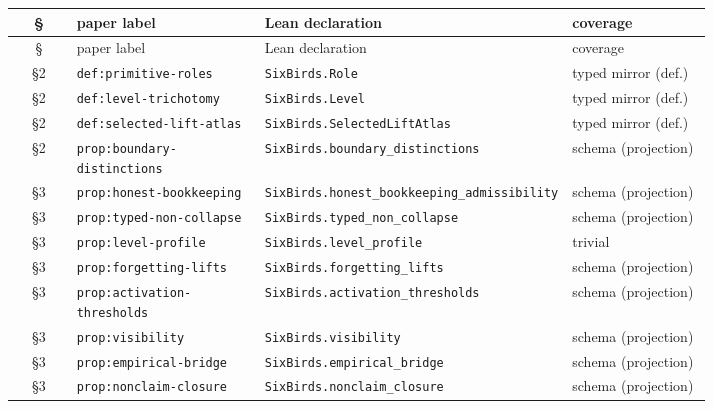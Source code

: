 \documentclass[11pt]{article}
\theoremstyle{definition}
\begin{document}
{\footnotesize
\begin{longtable}{@{}c >{\raggedright\arraybackslash}p{0.27\linewidth} >{\raggedright\arraybackslash}p{0.34\linewidth} >{\raggedright\arraybackslash}p{0.20\linewidth}@{}}
\toprule
\S & paper label & Lean declaration & coverage \\
\midrule
\endfirsthead
\toprule
\S & paper label & Lean declaration & coverage \\
\midrule
\endhead
\bottomrule
\endfoot
§2 & \texttt{def:\allowbreak primitive-\allowbreak roles} & \texttt{SixBirds.\allowbreak Role} & typed mirror (def.) \\
§2 & \texttt{def:\allowbreak level-\allowbreak trichotomy} & \texttt{SixBirds.\allowbreak Level} & typed mirror (def.) \\
§2 & \texttt{def:\allowbreak selected-\allowbreak lift-\allowbreak atlas} & \texttt{SixBirds.\allowbreak SelectedLiftAtlas} & typed mirror (def.) \\
§2 & \texttt{prop:\allowbreak boundary-\allowbreak distinctions} & \texttt{SixBirds.\allowbreak boundary\_\allowbreak distinctions} & schema (projection) \\
§3 & \texttt{prop:\allowbreak honest-\allowbreak bookkeeping} & \texttt{SixBirds.\allowbreak honest\_\allowbreak bookkeeping\_\allowbreak admissibility} & schema (projection) \\
§3 & \texttt{prop:\allowbreak typed-\allowbreak non-\allowbreak collapse} & \texttt{SixBirds.\allowbreak typed\_\allowbreak non\_\allowbreak collapse} & schema (projection) \\
§3 & \texttt{prop:\allowbreak level-\allowbreak profile} & \texttt{SixBirds.\allowbreak level\_\allowbreak profile} & trivial \\
§3 & \texttt{prop:\allowbreak forgetting-\allowbreak lifts} & \texttt{SixBirds.\allowbreak forgetting\_\allowbreak lifts} & schema (projection) \\
§3 & \texttt{prop:\allowbreak activation-\allowbreak thresholds} & \texttt{SixBirds.\allowbreak activation\_\allowbreak thresholds} & schema (projection) \\
§3 & \texttt{prop:\allowbreak visibility} & \texttt{SixBirds.\allowbreak visibility} & schema (projection) \\
§3 & \texttt{prop:\allowbreak empirical-\allowbreak bridge} & \texttt{SixBirds.\allowbreak empirical\_\allowbreak bridge} & schema (projection) \\
§3 & \texttt{prop:\allowbreak nonclaim-\allowbreak closure} & \texttt{SixBirds.\allowbreak nonclaim\_\allowbreak closure} & schema (projection) \\

\end{longtable}}
\end{document}
